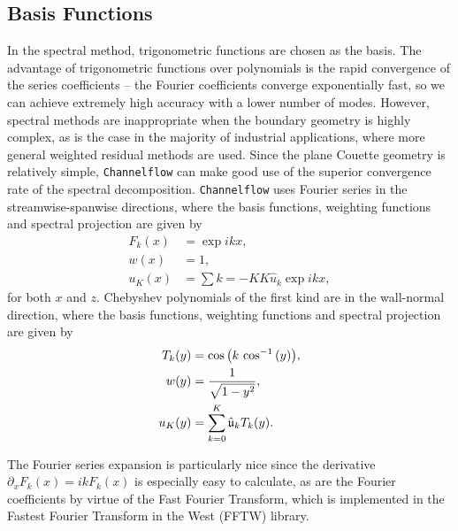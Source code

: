 \subsection{Basis Functions}

In the spectral method, trigonometric functions are chosen as the basis. The advantage of trigonometric functions over polynomials is the rapid convergence of the series coefficients -- the Fourier coefficients converge exponentially fast, so we can achieve extremely high accuracy with a lower number of modes. However, spectral methods are inappropriate when the boundary geometry is highly complex, as is the case in the majority of industrial applications, where more general weighted residual methods are used. Since the plane Couette geometry is relatively simple, {\tt Channelflow} can make good use of the superior convergence rate of the spectral decomposition. {\tt Channelflow} uses Fourier series in the streamwise-spanwise directions, where the basis functions, weighting functions and spectral projection are given by 
\begin{align}
F_k(x) &= \exp{ikx},\\
w(x) &= 1,\\
u_K(x) &= \sum{k=-K}{K}\hat{u}_k\exp{ikx},
\end{align}
for both $x$ and $z$. Chebyshev polynomials of the first kind are in the wall-normal direction, where the basis functions, weighting functions and spectral projection are given by
\begin{align}
T_k(y) &= \cos{k\textrm{ cos}^{-1}\paren{y}},\\
w(y) &= \frac{1}{\sqrt{1-y^2}}, \\
u_K(y) &= \sum{k=0}{K}\hat{\mathfrak{u}}_kT_k(y).
\end{align}
\par The Fourier series expansion is particularly nice since the derivative $\partial_x F_k(x) = ikF_k(x)$ is especially easy to calculate, as are the Fourier coefficients by virtue of the Fast Fourier Transform, which is implemented in the Fastest Fourier Transform in the West (FFTW) library.\\


